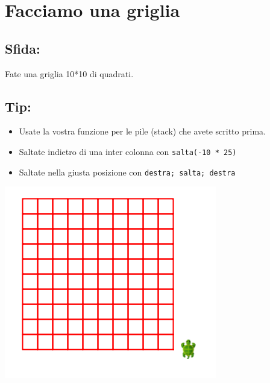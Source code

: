\chapter{Facciamo una griglia}
\begin{multicols}{2}
\section*{\color{BrickRed}Sfida:}
Fate una griglia 10*10 di quadrati.
\section*{\color{OliveGreen}Tip:}


\begin{itemize}

\item {Usate la vostra funzione per le pile (stack) che avete scritto prima.}
\item {Saltate indietro di una inter colonna con \lstinline{salta(-10 * 25)}}
\item {Saltate nella giusta posizione con \lstinline{destra; salta; destra}}

\end{itemize}



\columnbreak

\begin{center}
\includegraphics{../img/square-grid.png}
\end{center}

\end{multicols}

